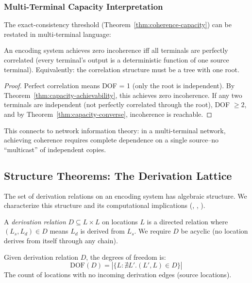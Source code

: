 \subsubsection{Multi-Terminal Capacity Interpretation}

The exact-consistency threshold (Theorem~\ref{thm:coherence-capacity}) can be restated in multi-terminal language:

\begin{corollary}\label{cor:multi-terminal}
An encoding system achieves zero incoherence iff all terminals are perfectly correlated (every terminal's output is a deterministic function of one source terminal). Equivalently: the correlation structure must be a tree with one root.
\end{corollary}

\begin{proof}
Perfect correlation means DOF = 1 (only the root is independent). By Theorem~\ref{thm:capacity-achievability}, this achieves zero incoherence. If any two terminals are independent (not perfectly correlated through the root), DOF $\geq 2$, and by Theorem~\ref{thm:capacity-converse}, incoherence is reachable.
\end{proof}

This connects to network information theory: in a multi-terminal network, achieving coherence requires complete dependence on a single source--no ``multicast'' of independent copies.

\subsection{Structure Theorems: The Derivation Lattice}\label{sec:derivation-structure}

The set of derivation relations on an encoding system has algebraic structure. We characterize this structure and its computational implications (, , ).

\begin{definition}\label{def:derivation-relation}
A \emph{derivation relation} $D \subseteq L \times L$ on locations $L$ is a directed relation where $(L_s, L_d) \in D$ means $L_d$ is derived from $L_s$. We require $D$ be acyclic (no location derives from itself through any chain).
\end{definition}

\begin{definition}\label{def:dof-derivation}
Given derivation relation $D$, the degrees of freedom is:
\[
\text{DOF}(D) = |\{L : \nexists L'. (L', L) \in D\}|
\]
The count of locations with no incoming derivation edges (source locations).
\end{definition}

